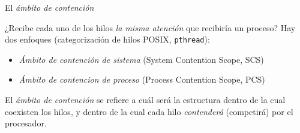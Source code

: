 \documentclass[presentation]{beamer}
\begin{document}
\begin{frame}[label={sec:org08ab7e6},fragile]{El \emph{ámbito de contención}}
 \begin{center}
¿Recibe cada uno de los hilos \emph{la misma atención} que recibiría un
proceso? Hay dos enfoques (categorización de hilos POSIX, \texttt{pthread}):
\end{center}

\begin{itemize}
\item \emph{Ámbito de contención de sistema} (System Contention Scope, SCS)
\item \emph{Ámbito de contencion de proceso} (Process Contention Scope, PCS)
\end{itemize}

\begin{center}
El \emph{ámbito de contención} se refiere a cuál será la estructura dentro
de la cual coexisten los hilos, y dentro de la cual cada hilo
\emph{contenderá} (competirá) por el procesador.
\end{center}
\end{frame}
\end{document}
